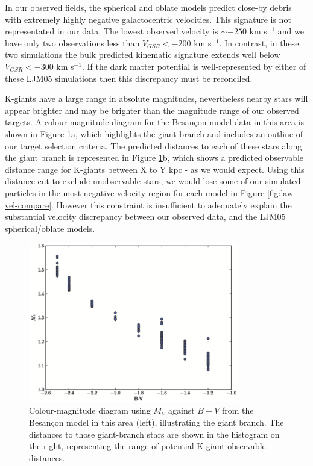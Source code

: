 \documentclass{emulateapj}
\begin{document}
		





	In our observed fields, the spherical and oblate models predict close-by debris with extremely highly negative galactocentric velocities. This signature is not representated in our data. The lowest observed velocity is $\sim -250$ km s$^{-1}$ and we have only two observations less than $V_{GSR} < -200$ km s$^{-1}$. In contrast, in these two simulations the bulk predicted kinematic signature extends well below $V_{GSR} < -300$ km s$^{-1}$. If the dark matter potential is well-represented by either of these LJM05 simulations then this discrepancy must be reconciled. 
	
	K-giants have a large range in absolute magnitudes, nevertheless nearby stars will appear brighter and may be brighter than the magnitude range of our observed targets. A colour-magnitude diagram for the Besan\c{c}on model data in this area is shown in Figure \ref{fig:besancon-cmd}a, which highlights the giant branch and includes an outline of our target selection criteria. The predicted distances to each of these stars along the giant branch is represented in Figure \ref{fig:besancon-cmd}b, which shows a predicted observable distance range for K-giants between X to Y kpc - as we would expect. Using this distance cut to exclude unobservable stars, we would lose some of our simulated particles in the most negative velocity region for each model in Figure \ref{fig:law-vel-compare}. However this constraint is insufficient to adequately explain the substantial velocity discrepancy between our observed data, and the LJM05 spherical/oblate models.
	
		
\begin{figure}[h!]
	\centering
	\includegraphics[width=9.2cm,height=7cm]{./figures/besancon-cmd_copy.eps}
	\caption{Colour-magnitude diagram using $M_V$ against $B-V$ from the Besan\c{c}on model in this area (left), illustrating the giant branch. The distances to those giant-branch stars are shown in the histogram on the right, representing the range of potential K-giant observable distances. }
	\label{fig:besancon-cmd}
\end{figure}
\end{document}
